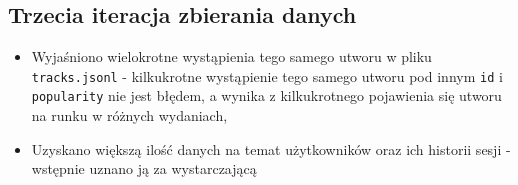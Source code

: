 \documentclass[10pt,a4paper]{article}
\begin{document}
\subsection{Trzecia iteracja zbierania danych}
\begin{itemize}
\item Wyjaśniono wielokrotne wystąpienia tego samego utworu w pliku \texttt{tracks.jsonl} - kilkukrotne wystąpienie tego samego utworu pod innym \texttt{id} i \texttt{popularity} nie jest błędem, a wynika z kilkukrotnego pojawienia się utworu na runku w różnych wydaniach,
\item Uzyskano większą ilość danych na temat użytkowników oraz ich historii sesji - wstępnie uznano ją za wystarczającą
\end{itemize}
\end{document}
